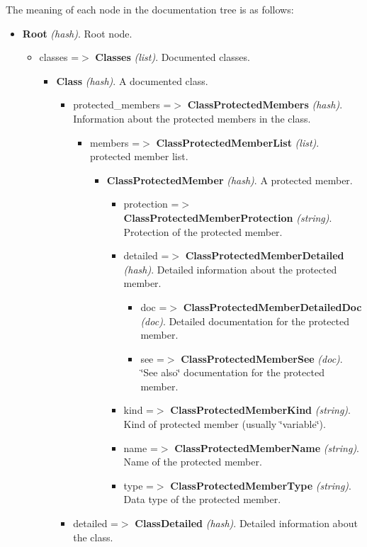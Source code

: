 The meaning of each node in the documentation tree is as follows: \begin{itemize}
\item {\bf Root} {\em (hash)\/}. Root node. \begin{itemize}
\item classes =$>$ {\bf Classes} {\em (list)\/}. Documented classes. \begin{itemize}
\item {\bf Class} {\em (hash)\/}. A documented class. \begin{itemize}
\item protected\_\-members =$>$ {\bf ClassProtectedMembers} {\em (hash)\/}. Information about the protected members in the class. \begin{itemize}
\item members =$>$ {\bf ClassProtectedMemberList} {\em (list)\/}. protected member list. \begin{itemize}
\item {\bf ClassProtectedMember} {\em (hash)\/}. A protected member. \begin{itemize}
\item protection =$>$ {\bf ClassProtectedMemberProtection} {\em (string)\/}. Protection of the protected member. \item detailed =$>$ {\bf ClassProtectedMemberDetailed} {\em (hash)\/}. Detailed information about the protected member. \begin{itemize}
\item doc =$>$ {\bf ClassProtectedMemberDetailedDoc} {\em (doc)\/}. Detailed documentation for the protected member. \item see =$>$ {\bf ClassProtectedMemberSee} {\em (doc)\/}. \char`\"{}See also\char`\"{} documentation for the protected member. \end{itemize}
\item kind =$>$ {\bf ClassProtectedMemberKind} {\em (string)\/}. Kind of protected member (usually \char`\"{}variable\char`\"{}). \item name =$>$ {\bf ClassProtectedMemberName} {\em (string)\/}. Name of the protected member. \item type =$>$ {\bf ClassProtectedMemberType} {\em (string)\/}. Data type of the protected member. \end{itemize}
\end{itemize}
\end{itemize}
\item detailed =$>$ {\bf ClassDetailed} {\em (hash)\/}. Detailed information about the class. \begin{itemize}

\end{itemize}
\end{itemize}
\end{itemize}
\end{itemize}
\end{itemize}
